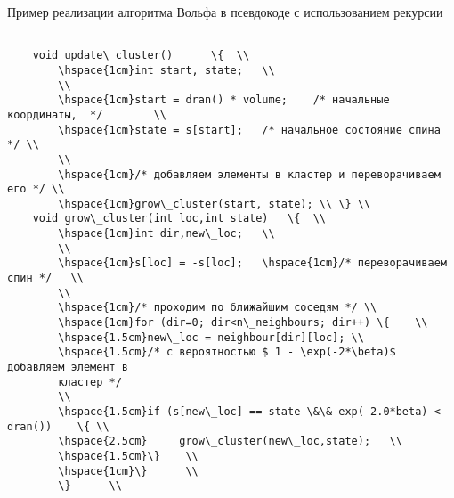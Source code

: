 \documentclass{beamer}
\begin{document}
\begin{frame}{Пример реализации алгоритма Вольфа в псевдокоде с использованием
рекурсии }
	\tiny
	\begin{verbatim}
	
	void update\_cluster()		\{	\\
		\hspace{1cm}int start, state;	\\
		\\
		\hspace{1cm}start = dran() * volume;	/* начальные координаты,  */		\\	
		\hspace{1cm}state = s[start];	/* начальное состояние спина */	\\
		\\
		\hspace{1cm}/* добавляем элементы в кластер и переворачиваем его */	\\
		\hspace{1cm}grow\_cluster(start, state); \\	\} \\
	void grow\_cluster(int loc,int state)	\{	\\
		\hspace{1cm}int dir,new\_loc;	\\
		\\
		\hspace{1cm}s[loc] = -s[loc];	\hspace{1cm}/* переворачиваем спин */	\\
		\\
		\hspace{1cm}/* проходим по ближайшим соседям */	\\
		\hspace{1cm}for (dir=0; dir<n\_neighbours; dir++) \{	\\
		\hspace{1.5cm}new\_loc = neighbour[dir][loc]; \\
		\hspace{1.5cm}/* с вероятностью $ 1 - \exp(-2*\beta)$ добавляем элемент в
		кластер */
		\\
		\hspace{1.5cm}if (s[new\_loc] == state \&\& exp(-2.0*beta) < dran())	\{ \\
		\hspace{2.5cm}     grow\_cluster(new\_loc,state);	\\ 
		\hspace{1.5cm}\}	\\
		\hspace{1cm}\}		\\
		\}		\\	     
	\end{verbatim}
		  
\end{frame}
\end{document}
